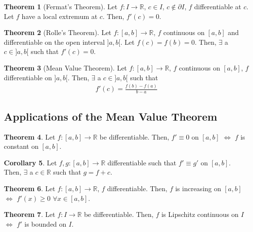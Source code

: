 \documentclass[reqno,11pt]{amsart}
\theoremstyle{definition}
\newtheorem{theorem}{Theorem}
\newtheorem{corollary}[theorem]{Corollary}
\theoremstyle{definition}
\theoremstyle{remark}
\newcommand{\R}{\mathbb{R}}
\begin{document}
\begin{theorem}[Fermat's Theorem]
	Let $f: I \rightarrow \R$, $c \in I$, $c \notin \partial I$, $f$ differentiable at $c$. Let $f$ have a local extremum at $c$. Then, $f'(c) =0$.
\end{theorem}

\begin{theorem}[Rolle's Theorem]
	Let $f: [a,b] \rightarrow \R$, $f$ continuous on $[a,b]$ and differentiable on the open interval $]a,b[$. Let $f(c) = f(b) =0$. Then, $\exists$ a $c \in ]a,b[$ such that $f'(c) =0$.
\end{theorem}

\begin{theorem}[Mean Value Theorem]
	Let $f: [a,b] \rightarrow \R$, $f$ continuous on $[a,b]$, $f$ differentiable on $]a,b[$. Then, $\exists$ a $c \in ]a,b[$ such that 
\begin{align}
	f'(c) = \frac{f(b) - f(a)}{b-a}	
\end{align}
\end{theorem}

\subsection{Applications of the Mean Value Theorem}
\begin{theorem}
Let $f: [a,b] \rightarrow \R$ be differentiable. Then, $f' \equiv 0$ on $[a,b]$ $\iff$ $f$ is constant on $[a,b]$.
\end{theorem}

\begin{corollary}
	Let $f, g: [a,b] \rightarrow \R$ differentiable such that $f' \equiv g'$ on $[a,b]$. Then, $\exists$ a $c \in \R$ such that $g = f+c$.
\end{corollary}

\begin{theorem}
	Let $f: [a,b] \rightarrow \R$, $f$ differentiable. Then, $f$ is increasing on $[a,b]$ $\iff$ $f'(x) \geq 0$ $\forall x \in [a,b]$.
\end{theorem}


\begin{theorem}
	Let $f: I \rightarrow \R$ be differentiable. Then, $f$ is Lipschitz continuous on $I$ $\iff$ $f'$ is bounded on $I$.
\end{theorem}
\end{document}
